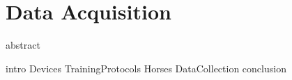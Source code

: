 \chapter{Data Acquisition}
\label{chapter:data}
\glsresetall
{abstract}



\clearpage
{intro}
{Devices}
{TrainingProtocols}
{Horses}
{DataCollection}
{conclusion}

